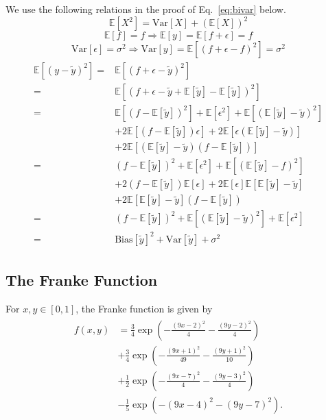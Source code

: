 \documentclass[a4paper, 
amsfonts, 
amssymb, 
amsmath, 
reprint, 
showkeys, 
nofootinbib, 
twoside]{revtex4-2}
\begin{document}
We use the following relations in the proof of Eq.~\eqref{eq:bivar} below.
\begin{equation}
	\mathbb{E}[X^2] = \mathrm{Var}[X] + \left(\mathbb{E}[X]\right)^2
\end{equation}
\begin{equation}
	\mathbb{E}[f]=f \Rightarrow \mathbb{E}[y]=\mathbb{E}[f+\epsilon] = f
\end{equation}
\begin{equation}
	\mathrm{Var}[\epsilon] = \sigma^2 \Rightarrow \mathrm{Var}[y] = \mathbb{E}[(f+\epsilon-f)^2] = \sigma^2
\end{equation}
\begin{align}\label{eq:der_bivar}
\begin{split}
	\mathbb{E}[(y-\tilde{y})^2] =& \mathbb{E}[(f+\epsilon - \tilde{y})^2] \\
	=& \mathbb{E}[\left(f+\epsilon - \tilde{y} + \mathbb{E}[\tilde{y}] - \mathbb{E}[\tilde{y}]\right)^2] \\
	=& \mathbb{E}[(f-\mathbb{E}[\tilde{y}])^2] + \mathbb{E}[\epsilon^2] + \mathbb{E}[(\mathbb{E}[\tilde{y}]-\tilde{y})^2] \\
	&+ 2\mathbb{E}[(f-\mathbb{E}[\tilde{y}])\epsilon] 
	+ 2\mathbb{E}[\epsilon(\mathbb{E}[\tilde{y}]-\tilde{y})] \\ &+ 2\mathbb{E}[(\mathbb{E}[\tilde{y}]-\tilde{y})(f-\mathbb{E}[\tilde{y}])] \\
	=& (f-\mathbb{E}[\tilde{y}])^2 + \mathbb{E}[\epsilon^2] + \mathbb{E}[(\mathbb{E}[\tilde{y}]-f)^2] \\
	&+ 2(f-\mathbb{E}[\tilde{y}])\mathbb{E}[\epsilon] 
	+ 2\mathbb{E}[\epsilon]\mathbb{E}[\mathbb{E}[\tilde{y}]-\tilde{y}] \\ &+ 2\mathbb{E}[\mathbb{E}[\tilde{y}]-\tilde{y}](f-\mathbb{E}[\tilde{y}]) \\
	=& (f-\mathbb{E}[\tilde{y}])^2 + \mathbb{E}[(\mathbb{E}[\tilde{y}]-\tilde{y})^2] + \mathbb{E}[\epsilon^2]  \\
	=& \mathrm{Bias}[\tilde{y}]^2  + \mathrm{Var}[\tilde{y}] + \sigma^2
\end{split}
\end{align}

\subsection{The Franke Function}
For $x,y \in [0, 1]$, the Franke function is given by~\cite{Franke}
\begin{align}\label{eq:franke}
\begin{split}
	f\left(x,y\right) &=\frac{3}{4}\exp\left(-\frac{\left(9x-2\right)^2}{4}-\frac{\left(9y-2\right)^2}{4} \right) \\
	&+\frac{3}{4}\exp\left(-\frac{\left(9x+1\right)^2}{49}-\frac{\left(9y+1\right)^2}{10} \right) \\
	&+\frac{1}{2}\exp\left(-\frac{\left(9x-7\right)^2}{4}-\frac{\left(9y-3\right)^2}{4} \right) \\
	&-\frac{1}{5}\exp\left(-\left(9x-4\right)^2-\left(9y-7\right)^2 \right).
	\end{split}
\end{align}
\end{document}
